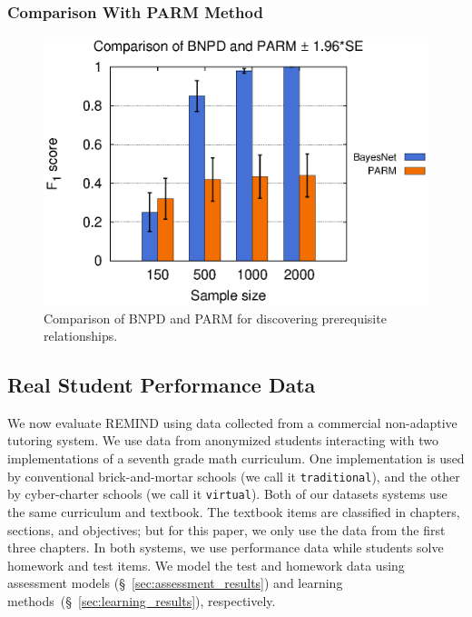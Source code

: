 \documentclass{edm_template}
\begin{document}
{	
	\subsubsection{Comparison With PARM Method}
		\begin{figure}[!th]
			\begin{center}
				\centering
					\includegraphics[width=0.8\linewidth]{figures/F1_parm.eps}
			\end{center}
			\caption{Comparison of BNPD and PARM for discovering prerequisite relationships.}
			\label{fig:f1-parm} 
		\end{figure}	 
	
	\subsection{Real Student Performance Data}
	\label{sec:real}
	We now evaluate REMIND using data collected from a commercial non-adaptive tutoring system.
	We use data from anonymized students interacting with two implementations of a seventh grade math curriculum.
	One implementation is used by conventional brick-and-mortar schools (we call it \texttt{traditional}),
	and the other by cyber-charter schools (we call it \texttt{virtual}).
	Both of our datasets systems use the same curriculum and textbook.
	The textbook items are classified in chapters, sections, and objectives; but for this paper, we only use the data from the first three chapters.
	In both systems, we use  performance data while students solve homework and test items.
	We model the test and homework data using assessment models (\S~\ref{sec:assessment_results}) and learning methods~(\S~\ref{sec:learning_results}), respectively.
	
}
\end{document}
